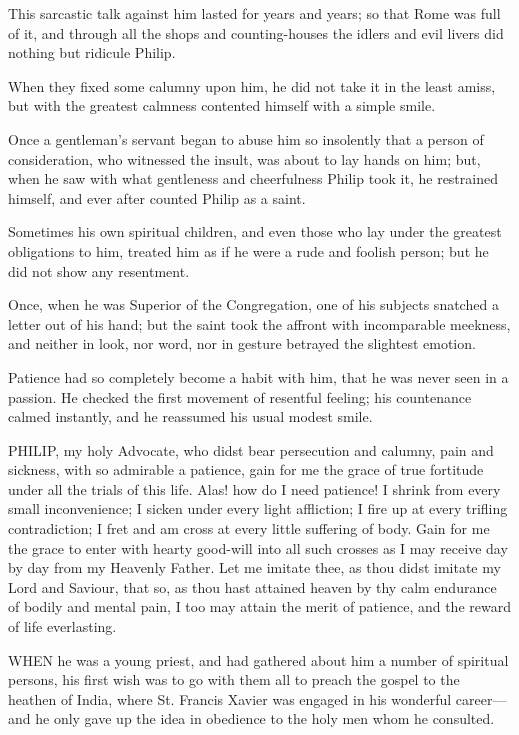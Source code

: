 This sarcastic talk against him
lasted for years and years; so that Rome was full of it, and through all
the shops and counting-houses the idlers and evil livers did nothing but
ridicule Philip.

When they fixed some calumny
upon him, he did not take it in the least amiss, but with the greatest
calmness contented himself with a simple smile.

Once a gentleman's servant began
to abuse him so insolently that a person of consideration, who witnessed
the insult, was about to lay hands on him; but, when he saw with what
gentleness and cheerfulness Philip took it, he restrained himself, and
ever after counted Philip as a saint.

Sometimes his own spiritual
children, and even those who lay under the greatest obligations to
him, treated him as if he were a rude and foolish person; but he did not
show any resentment.

Once, when he was Superior of
the Congregation, one of his subjects snatched a letter out of his hand;
but the saint took the affront with incomparable meekness, and neither
in look, nor word, nor in gesture betrayed the slightest emotion.

Patience had so completely
become a habit with him, that he was never seen in a passion. He checked
the first movement of resentful feeling; his countenance calmed
instantly, and he reassumed his usual modest smile.


PHILIP, my holy
Advocate, who didst bear persecution and calumny, pain and sickness,
with so admirable a patience, gain for me the grace of true fortitude
under all the trials of this life. Alas! how do I need patience! I
shrink from every small inconvenience; I sicken under every light
affliction; I fire up at every trifling contradiction; I fret and am
cross at every little suffering of body. Gain for me the grace to enter
with hearty good-will into all such crosses as I may receive day by day
from my Heavenly Father. Let me imitate thee, as thou didst imitate my
Lord and Saviour, that so, as thou hast attained heaven by thy calm
endurance of bodily and mental pain, I too may attain the merit of
patience, and the reward of life everlasting.



WHEN he was a young
priest, and had gathered about him a number of spiritual persons, his
first wish was to go with them all to preach the gospel to the heathen
of India, where St. Francis Xavier was engaged in his wonderful
career—and he only gave up the idea in obedience to the holy men whom
he consulted.

